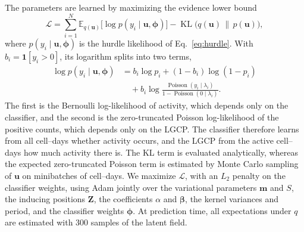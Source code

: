 The parameters are learned by maximizing the evidence lower bound
\begin{equation}
    \mathcal{L}
    =\sum_{i=1}^{N}\mathbb{E}_{q(\mathbf{u})}\bigl[\log p(y_i\mid\mathbf{u},\boldsymbol{\phi})\bigr]
    -\operatorname{KL}\bigl(q(\mathbf{u})\,\|\,p(\mathbf{u})\bigr),
\end{equation}
where $p(y_i\mid\mathbf{u},\boldsymbol{\phi})$ is the hurdle likelihood of Eq.~\eqref{eq:hurdle}. With $b_i=\mathbf{1}[y_i>0]$, its logarithm splits into two terms,
\begin{equation}
    \begin{aligned}
        \log p(y_i\mid\mathbf{u},\boldsymbol{\phi})
        &=b_i\log p_i+(1-b_i)\log(1-p_i)\\
        &\quad+b_i\log\frac{\operatorname{Poisson}(y_i\mid\lambda_i)}{1-\operatorname{Poisson}(0\mid\lambda_i)}.
    \end{aligned}
\end{equation}
The first is the Bernoulli log-likelihood of activity, which depends only on the classifier, and the second is the zero-truncated Poisson log-likelihood of the positive counts, which depends only on the LGCP. The classifier therefore learns from all cell--days whether activity occurs, and the LGCP from the active cell--days how much activity there is.
The KL term is evaluated analytically, whereas the expected zero-truncated Poisson term is estimated by Monte Carlo sampling of $\mathbf{u}$ on minibatches of cell--days. We maximize $\mathcal{L}$, with an $L_2$ penalty on the classifier weights, using Adam jointly over the variational parameters $\mathbf{m}$ and $S$, the inducing positions $\mathbf{Z}$, the coefficients $\alpha$ and $\boldsymbol{\beta}$, the kernel variances and period, and the classifier weights $\boldsymbol{\phi}$. At prediction time, all expectations under $q$ are estimated with 300 samples of the latent field.
